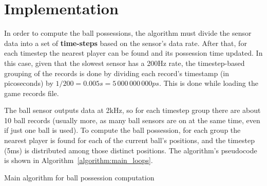 \documentclass[a4paper, 10pt]{article}
\begin{document}
\section*{Implementation}

In order to compute the ball possessions, the algorithm must divide the sensor data into a set of {\bf time-steps} based on the sensor's data rate.
After that, for each timestep the nearest player can be found and its possession time updated.
In this case, given that the slowest sensor has a 200Hz rate, the timestep-based grouping of the records is done by dividing each record's timestamp (in picoseconds) by $1 / 200 = 0.005s = 5\,000\,000\,000ps$.
This is done while loading the game records file.


The ball sensor outputs data at 2kHz, so for each timestep group there are about 10 ball records (usually more, as many ball sensors are on at the same time, even if just one ball is used).
To compute the ball possession, for each group the nearest player is found for each of the current ball's positions, and the timestep (5ms) is distributed among those distinct positions.
The algorithm's pseudocode is shown in Algorithm~\ref{algorithm:main_loops}.

\begin{algorithm}[tb]

    \BlankLine
    \caption{Main algorithm for ball possession computation}
    \label{algorithm:main_loops}
\end{algorithm}
\end{document}
